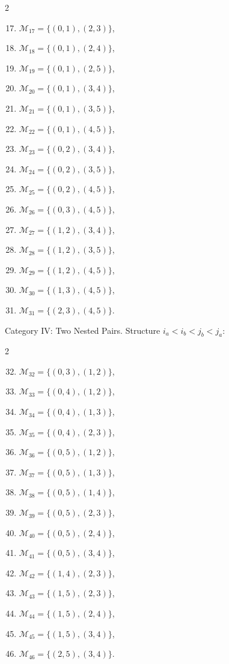 \documentclass[runningheads]{llncs}
\begin{document}
\begin{multicols}{2}
\begin{enumerate}
  \setcounter{enumi}{16}
  \item $\mathcal{M}_{17} = \{(0,1), (2,3)\}$,
  \item $\mathcal{M}_{18} = \{(0,1), (2,4)\}$,
  \item $\mathcal{M}_{19} = \{(0,1), (2,5)\}$,
  \item $\mathcal{M}_{20} = \{(0,1), (3,4)\}$,
  \item $\mathcal{M}_{21} = \{(0,1), (3,5)\}$,
  \item $\mathcal{M}_{22} = \{(0,1), (4,5)\}$,
  \item $\mathcal{M}_{23} = \{(0,2), (3,4)\}$,
  \item $\mathcal{M}_{24} = \{(0,2), (3,5)\}$,
  \item $\mathcal{M}_{25} = \{(0,2), (4,5)\}$,
  \item $\mathcal{M}_{26} = \{(0,3), (4,5)\}$,
  \item $\mathcal{M}_{27} = \{(1,2), (3,4)\}$,
  \item $\mathcal{M}_{28} = \{(1,2), (3,5)\}$,
  \item $\mathcal{M}_{29} = \{(1,2), (4,5)\}$,
  \item $\mathcal{M}_{30} = \{(1,3), (4,5)\}$,
  \item $\mathcal{M}_{31} = \{(2,3), (4,5)\}$.
\end{enumerate}
\end{multicols}
Category IV: Two Nested Pairs. Structure $i_a < i_b < j_b < j_a$:
\begin{multicols}{2}
\begin{enumerate}
  \setcounter{enumi}{31}
  \item $\mathcal{M}_{32} = \{(0,3), (1,2)\}$,
  \item $\mathcal{M}_{33} = \{(0,4), (1,2)\}$,
  \item $\mathcal{M}_{34} = \{(0,4), (1,3)\}$,
  \item $\mathcal{M}_{35} = \{(0,4), (2,3)\}$,
  \item $\mathcal{M}_{36} = \{(0,5), (1,2)\}$,
  \item $\mathcal{M}_{37} = \{(0,5), (1,3)\}$,
  \item $\mathcal{M}_{38} = \{(0,5), (1,4)\}$,
  \item $\mathcal{M}_{39} = \{(0,5), (2,3)\}$,
  \item $\mathcal{M}_{40} = \{(0,5), (2,4)\}$,
  \item $\mathcal{M}_{41} = \{(0,5), (3,4)\}$,
  \item $\mathcal{M}_{42} = \{(1,4), (2,3)\}$,
  \item $\mathcal{M}_{43} = \{(1,5), (2,3)\}$,
  \item $\mathcal{M}_{44} = \{(1,5), (2,4)\}$,
  \item $\mathcal{M}_{45} = \{(1,5), (3,4)\}$,
  \item $\mathcal{M}_{46} = \{(2,5), (3,4)\}$.
\end{enumerate}
\end{multicols}
\end{document}
